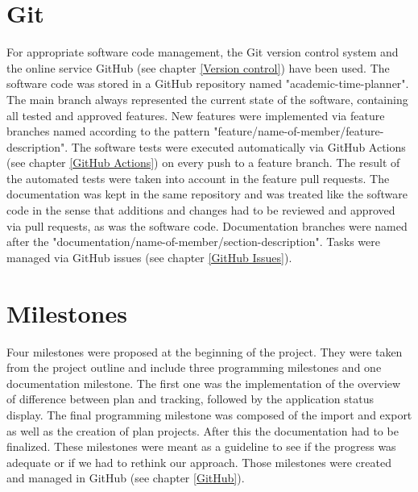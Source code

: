 \section{Git}
For appropriate software code management, the Git version control system and the online service GitHub (see chapter \ref{Version control}) have been used. The software code was stored in a GitHub repository named "academic-time-planner". The main branch always represented the current state of the software, containing all tested and approved features. New features were implemented via feature branches named according to the pattern "feature/name-of-member/feature-description". The software tests were executed automatically via GitHub Actions (see chapter \ref{GitHub Actions}) on every push to a feature branch. The result of the automated tests were taken into account in the feature pull requests. The documentation was kept in the same repository and was treated like the software code in the sense that additions and changes had to be reviewed and approved via pull requests, as was the software code. Documentation branches were named after the "documentation/name-of-member/section-description". Tasks were managed via GitHub issues (see chapter \ref{GitHub Issues}).

\section{Milestones} \label{Milestones}
Four milestones were proposed at the beginning of the project. They were taken from the project outline and include three programming milestones and one documentation milestone. The first one was the implementation of the overview of difference between plan and tracking, followed by the application status display. The final programming milestone was composed of the import and export as well as the creation of plan projects. After this the documentation had to be finalized. These milestones were meant as a guideline to see if the progress was adequate or if we had to rethink our approach. Those milestones were created and managed in GitHub (see chapter \ref{GitHub}). 


